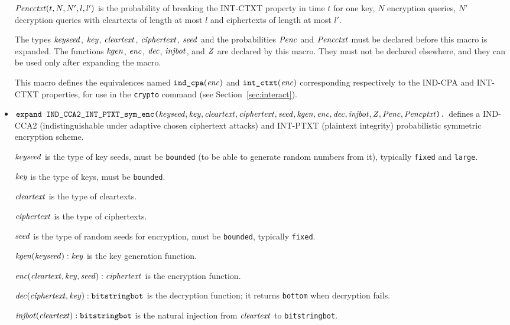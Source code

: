 \documentclass{article}
\begin{document}
\begin{itemize}
  $\mathit{Pencctxt}(t, N, N', l, l')$ is the probability of breaking the
  INT-CTXT property in time $t$ for one key, $N$ encryption queries,
  $N'$ decryption queries with cleartexts of length at most $l$ and
  ciphertexts of length at most $l'$.

   The types $\mathit{keyseed}$, $\mathit{key}$, $\mathit{cleartext}$,
   $\mathit{ciphertext}$, $\mathit{seed}$ and the probabilities $\mathit{Penc}$ and $\mathit{Pencctxt}$ must
   be declared before this macro is expanded. The functions
   $\mathit{kgen}$, $\mathit{enc}$, $\mathit{dec}$, $\mathit{injbot}$, and $\mathit{Z}$ are declared by this
   macro. They must not be declared elsewhere, and they can be used
   only after expanding the macro.

   This macro defines the equivalences named $\texttt{ind\_cpa}(\mathit{enc})$
   and $\texttt{int\_ctxt}(\mathit{enc})$ corresponding respectively to the
   IND-CPA and INT-CTXT properties, for use in the \texttt{crypto} command 
   (see Section~\ref{sec:interact}).

\item $\texttt{expand IND\_CCA2\_INT\_PTXT\_sym\_enc(}\mathit{keyseed}, \mathit{key},
  \mathit{cleartext}, \mathit{ciphertext}, \mathit{seed}, \mathit{kgen}, \mathit{enc},
  \mathit{dec}, \mathit{injbot}, \allowbreak \mathit{Z}, \allowbreak \mathit{Penc}, \allowbreak \mathit{Pencptxt}\texttt{).}$ defines a
  IND-CCA2 (indistinguishable under adaptive chosen ciphertext attacks) and INT-PTXT (plaintext integrity)
  probabilistic symmetric encryption scheme.

   $\mathit{keyseed}$ is the type of key seeds, must be \texttt{bounded} (to be able to generate random numbers from it), typically \texttt{fixed} and \texttt{large}.

   $\mathit{key}$ is the type of keys, must be \texttt{bounded}.

   $\mathit{cleartext}$ is the type of cleartexts.

   $\mathit{ciphertext}$ is the type of ciphertexts.

   $\mathit{seed}$ is the type of random seeds for encryption, must be \texttt{bounded}, typically \texttt{fixed}.

   $\mathit{kgen}(\mathit{keyseed}): \mathit{key}$ is the key generation function.

   $\mathit{enc}(\mathit{cleartext}, \mathit{key}, \mathit{seed}): \mathit{ciphertext}$ is the encryption function.

   $\mathit{dec}(\mathit{ciphertext}, \mathit{key}): \texttt{bitstringbot}$ is the
  decryption function; it returns \texttt{bottom} when decryption
  fails.

   $\mathit{injbot}(\mathit{cleartext}): \texttt{bitstringbot}$ is the natural
  injection from $\mathit{cleartext}$ to \texttt{bitstringbot}.


\end{itemize}
\end{document}
